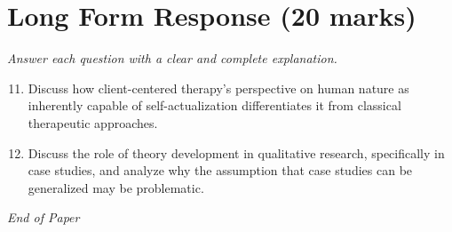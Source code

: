 \documentclass[12pt]{article}
\begin{document}
\section*{Long Form Response (20 marks)}
\textit{Answer each question with a clear and complete explanation.}
\begin{enumerate}[label=\arabic*.]
\setcounter{enumi}{10}
\item Discuss how client-centered therapy's perspective on human nature as inherently capable of self-actualization differentiates it from classical therapeutic approaches.
\item Discuss the role of theory development in qualitative research, specifically in case studies, and analyze why the assumption that case studies can be generalized may be problematic.
\end{enumerate}

\vfill
\noindent\textit{End of Paper}
\end{document}
